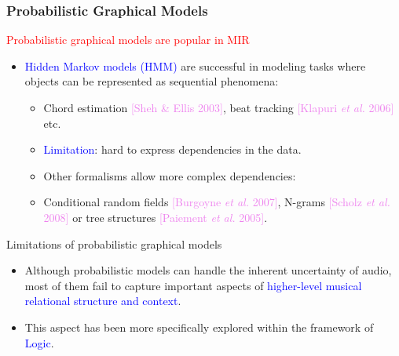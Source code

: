 \documentclass[12pt]{beamer}
\begin{document}
\begin{frame}
\frametitle{Probabilistic Graphical Models}

\textcolor{red}{Probabilistic graphical models are popular in MIR}
\bigskip 

\begin{itemize}

\item \textcolor{blue}{Hidden Markov models (HMM)} are successful in modeling tasks where objects can be represented as sequential phenomena: 
\begin{itemize}
	\item Chord estimation \textcolor{violet}{[Sheh \& Ellis 2003]}, beat tracking \textcolor{violet}{[Klapuri \textit{et al.}  2006]} etc.
	\item \textcolor{blue}{Limitation}: hard to express dependencies in the data. 
\medskip

\item Other formalisms allow more complex dependencies:
  \end{itemize}
\begin{itemize}
\item Conditional random fields \textcolor{violet}{[Burgoyne \textit{et al.} 2007]}, N-grams \textcolor{violet}{[Scholz \textit{et al.} 2008]} or tree structures \textcolor{violet}{[Paiement \textit{et al.} 2005]}.
  
\end{itemize}
\end{itemize} 
\end{frame} 

\begin{frame}{Limitations of probabilistic graphical models}
\begin{itemize}   
\item Although probabilistic models can handle the inherent
  uncertainty of audio, most of them fail to capture important aspects
  of \textcolor{blue}{higher-level musical relational structure and
    context}.
\medskip
\item This aspect has been more specifically explored within the framework of \textcolor{blue}{Logic}.
\end{itemize}
\end{frame}
\end{document}

